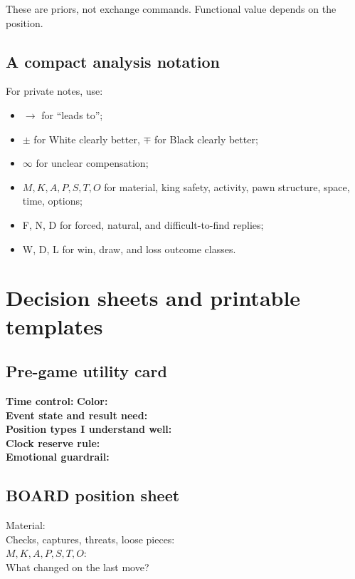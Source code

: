 These are priors, not exchange commands. Functional value depends on the position.

\section{A compact analysis notation}
For private notes, use:

\begin{itemize}[leftmargin=1.4em]
\item $\rightarrow$ for ``leads to'';
\item $\pm$ for White clearly better, $\mp$ for Black clearly better;
\item $\infty$ for unclear compensation;
\item $M,K,A,P,S,T,O$ for material, king safety, activity, pawn structure, space, time, options;
\item F, N, D for forced, natural, and difficult-to-find replies;
\item W, D, L for win, draw, and loss outcome classes.
\end{itemize}

\chapter{Decision sheets and printable templates}

\section{Pre-game utility card}
\begin{tcolorbox}[colback=white,colframe=Teal,title={Event and preference frame},fonttitle=\sffamily\bfseries,height=2.55in]
\textbf{Time control:}\hrulefill\quad
\textbf{Color:}\hrulefill\\[1em]
\textbf{Event state and result need:}\hrulefill\\[1.1em]
\textbf{Position types I understand well:}\hrulefill\\[1.1em]
\textbf{Clock reserve rule:}\hrulefill\\[1.1em]
\textbf{Emotional guardrail:}\hrulefill
\end{tcolorbox}

\section{BOARD position sheet}
\begin{tcolorbox}[colback=white,colframe=Navy,title={B --- Board facts},fonttitle=\sffamily\bfseries,height=2.15in]
Material:\hrulefill\\[.8em]
Checks, captures, threats, loose pieces:\hrulefill\\[.8em]
$M,K,A,P,S,T,O$:\hrulefill\\[.8em]
What changed on the last move?\hrulefill
\end{tcolorbox}

